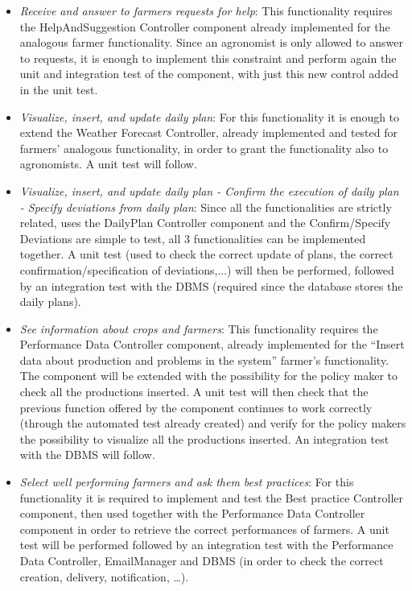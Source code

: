 \documentclass{article}
\begin{document}
\begin{itemize}
        \item \textit{Receive and answer to farmers requests for help}: This functionality requires the HelpAndSuggestion Controller component already implemented for the analogous farmer functionality. Since an agronomist is only allowed to answer to requests, it is enough to implement this constraint and perform again the unit and integration test of the component, with just this new control added in the unit test.
        
        \newpage
        
        \item \textit{Visualize, insert, and update daily plan}: For this functionality it is enough to extend the Weather Forecast Controller, already implemented and tested for farmers’ analogous functionality, in order to grant the functionality also to agronomists. A unit test will follow.
        
        \item \textit{Visualize, insert, and update daily plan - Confirm the execution of daily plan - Specify deviations from daily plan}: Since all the functionalities are strictly related, uses the DailyPlan Controller component and the Confirm/Specify Deviations are simple to test, all 3 functionalities can be implemented together. A unit test (used to check the correct update of plans, the correct confirmation/specification of deviations,...) will then be performed, followed by an integration test with the DBMS (required since the database stores the daily plans).
        
        \item \textit{See information about crops and farmers}: This functionality requires the Performance Data Controller component, already implemented for the “Insert data about production and problems in the system” farmer’s functionality. The component will be extended with the possibility for the policy maker to check all the productions inserted. A unit test will then check that the previous function offered by the component continues to work correctly (through the automated test already created) and verify for the policy makers the possibility to visualize all the productions inserted. An integration test with the DBMS will follow.
        
        \item \textit{Select well performing farmers and ask them best practices}: For this functionality it is required to implement and test the Best practice Controller component, then used together with the Performance Data Controller component in order to retrieve the correct performances of farmers. A unit test will be performed followed by an integration test with the Performance Data Controller, EmailManager and DBMS (in order to check the correct creation, delivery, notification, …).
        

\end{itemize}
\end{document}
